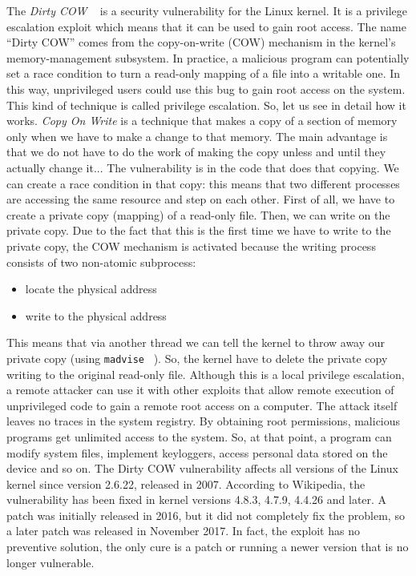 \documentclass{masterthesis}
\begin{document}
The \emph{Dirty COW} ~\cite{alam2017study} is a security vulnerability for the Linux kernel. It is a privilege escalation exploit which means that it can be used to gain root access.
The name ``Dirty COW'' comes from the copy-on-write (COW) mechanism in the kernel's memory-management subsystem. 
In practice, a malicious program can potentially set a race condition to turn a read-only mapping of a file into a writable one. In this way, unprivileged users could use this bug to gain root access on the system. This kind of technique is called privilege escalation.
So, let us see in detail how it works.
\emph{Copy On Write} is a technique that makes a copy of a section of memory only when we have to make a change to that memory. The main advantage is that we do not have to do the work of making the copy unless and until they actually change it...
The vulnerability is in the code that does that copying. We can create a race condition in that copy: this means that two different processes are accessing the same resource and step on each other. 
First of all, we have to create a private copy (mapping) of a read-only file. Then, we can write on the private copy. Due to the fact that this is the first time we have to write to the private copy, the COW mechanism is activated because the writing process consists of two non-atomic subprocess:
\begin{itemize}
\item locate the physical address
\item write to the physical address
\end{itemize}
This means that via another thread we can tell the kernel to throw away our private copy (using \texttt{madvise} ~\cite{madvise}). So, the kernel have to delete the private copy writing to the original read-only file.
Although this is a local privilege escalation, a remote attacker can use it with other exploits that allow remote execution of unprivileged code to gain a remote root access on a computer. The attack itself leaves no traces in the system registry.
By obtaining root permissions, malicious programs get unlimited access to the system.
So, at that point, a program can modify system files, implement keyloggers, access personal data stored on the device and so on.
The Dirty COW vulnerability affects all versions of the Linux kernel since version 2.6.22, released in 2007. According to Wikipedia, the vulnerability has been fixed in kernel versions 4.8.3, 4.7.9, 4.4.26 and later. 
A patch was initially released in 2016, but it did not completely fix the problem, so a later patch was released in November 2017. In fact, the exploit has no preventive solution, the only cure is a patch or running a newer version that is no longer vulnerable.
\end{document}
